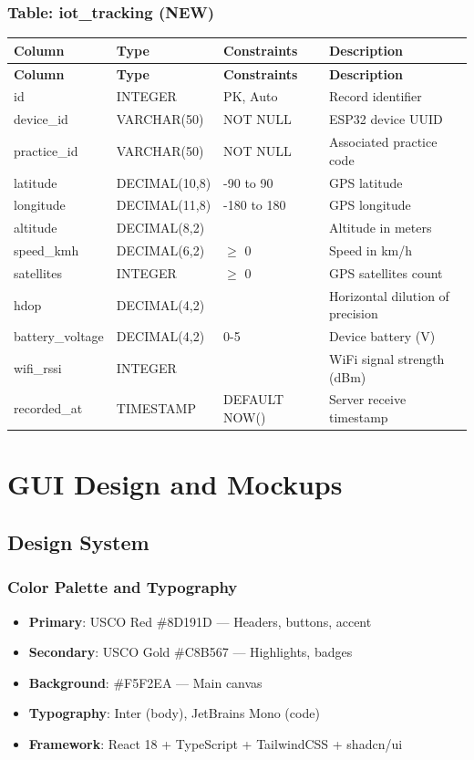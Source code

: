 \documentclass[12pt,a4paper]{report}
\begin{document}
\subsection{Table: iot\_tracking (NEW)}
\begin{longtable}{|p{3.5cm}|p{2.5cm}|p{2cm}|p{5.5cm}|}
\hline
\textbf{Column} & \textbf{Type} & \textbf{Constraints} & \textbf{Description} \\
\hline
\endfirsthead
\hline \textbf{Column} & \textbf{Type} & \textbf{Constraints} & \textbf{Description} \\ \hline \endhead
id & INTEGER & PK, Auto & Record identifier \\
\hline
device\_id & VARCHAR(50) & NOT NULL & ESP32 device UUID \\
\hline
practice\_id & VARCHAR(50) & NOT NULL & Associated practice code \\
\hline
latitude & DECIMAL(10,8) & -90 to 90 & GPS latitude \\
\hline
longitude & DECIMAL(11,8) & -180 to 180 & GPS longitude \\
\hline
altitude & DECIMAL(8,2) & & Altitude in meters \\
\hline
speed\_kmh & DECIMAL(6,2) & $\geq$ 0 & Speed in km/h \\
\hline
satellites & INTEGER & $\geq$ 0 & GPS satellites count \\
\hline
hdop & DECIMAL(4,2) & & Horizontal dilution of precision \\
\hline
battery\_voltage & DECIMAL(4,2) & 0-5 & Device battery (V) \\
\hline
wifi\_rssi & INTEGER & & WiFi signal strength (dBm) \\
\hline
recorded\_at & TIMESTAMP & DEFAULT NOW() & Server receive timestamp \\
\hline
\end{longtable}

\chapter{GUI Design and Mockups}

\section{Design System}

\subsection{Color Palette and Typography}
\begin{itemize}
    \item \textbf{Primary}: \textcolor{uscoRed}{USCO Red \#8D191D} — Headers, buttons, accent
    \item \textbf{Secondary}: \textcolor{uscoGold}{USCO Gold \#C8B567} — Highlights, badges
    \item \textbf{Background}: \#F5F2EA — Main canvas
    \item \textbf{Typography}: Inter (body), JetBrains Mono (code)
    \item \textbf{Framework}: React 18 + TypeScript + TailwindCSS + shadcn/ui
\end{itemize}
\end{document}
